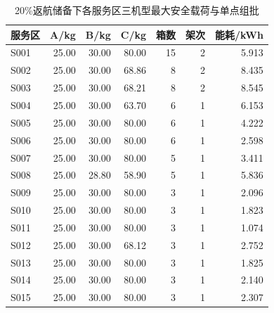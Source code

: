 \begin{table}[H]\centering\normalsize
\caption{20\%返航储备下各服务区三机型最大安全载荷与单点组批}\label{tab:q1_capacity_batches}
\begin{tabular}{lrrrrrr}
\toprule
服务区 & A/kg & B/kg & C/kg & 箱数 & 架次 & 能耗/kWh\\\midrule
S001 & 25.00 & 30.00 & 80.00 & 15 & 2 & 5.913\\
S002 & 25.00 & 30.00 & 68.86 & 8 & 2 & 8.435\\
S003 & 25.00 & 30.00 & 68.21 & 8 & 2 & 8.545\\
S004 & 25.00 & 30.00 & 63.70 & 6 & 1 & 6.153\\
S005 & 25.00 & 30.00 & 80.00 & 6 & 1 & 4.222\\
S006 & 25.00 & 30.00 & 80.00 & 6 & 1 & 2.598\\
S007 & 25.00 & 30.00 & 80.00 & 5 & 1 & 3.411\\
S008 & 25.00 & 28.80 & 58.90 & 5 & 1 & 5.836\\
S009 & 25.00 & 30.00 & 80.00 & 3 & 1 & 2.096\\
S010 & 25.00 & 30.00 & 80.00 & 3 & 1 & 1.823\\
S011 & 25.00 & 30.00 & 80.00 & 3 & 1 & 1.074\\
S012 & 25.00 & 30.00 & 68.12 & 3 & 1 & 2.752\\
S013 & 25.00 & 30.00 & 80.00 & 3 & 1 & 1.825\\
S014 & 25.00 & 30.00 & 80.00 & 3 & 1 & 2.140\\
S015 & 25.00 & 30.00 & 80.00 & 3 & 1 & 2.307\\
\bottomrule\end{tabular}
\end{table}
